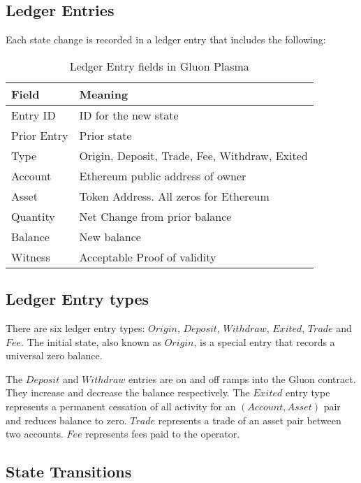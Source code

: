 \documentclass[12pt,a4paper]{article}
\begin{document}
\subsection{Ledger Entries}
Each state change is recorded in a ledger entry that includes the following:

\begin{table}[ht]
\caption{Ledger Entry fields in Gluon Plasma}
\centering
\begin{tabular}{|l|l|}
\hline
\bfseries    Field & \bfseries Meaning \\
\hline
    Entry ID &ID for the new state \\
    Prior Entry	& Prior state \\
    Type &	Origin, Deposit, Trade, Fee, Withdraw, Exited \\
    Account &	Ethereum public address of owner \\
    Asset &	Token Address. All zeros for Ethereum \\
    Quantity &	Net Change from prior balance \\
    Balance	 & New balance \\
    Witness	& Acceptable Proof of validity \\
\hline
\end{tabular}
\end{table}

\subsection{Ledger Entry types}
There are six ledger entry types: $Origin$, $Deposit$, $Withdraw$, $Exited$, $Trade$ and $Fee$.
The initial state, also known as $Origin$, is a special entry that records a universal zero balance.

The $Deposit$ and $Withdraw$ entries are on and off ramps into the Gluon contract. They increase and decrease the balance respectively. The $Exited$ entry type represents a permanent cessation of all activity for an \((Account, Asset)\) pair and reduces balance to zero. $Trade$ represents a trade of an asset pair between two accounts. $Fee$ represents fees paid to the operator.

\subsection{State Transitions}
\end{document}
